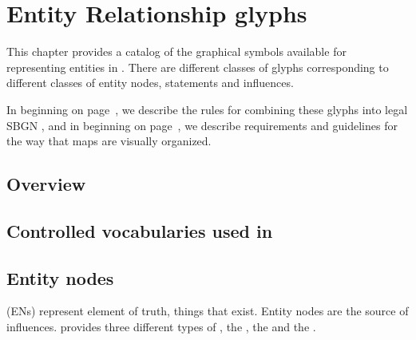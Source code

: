 
\chapter{Entity Relationship glyphs}
\label{chp:glyph}

This chapter provides a catalog of the graphical symbols available for representing entities in \ERms.  There are different classes of glyphs corresponding to different classes of entity nodes, statements and influences.

In  beginning on page~\pageref{chp:grammar}, we describe the rules for combining these glyphs into legal SBGN \ERs, and in  beginning on page~\pageref{chp:layout}, we describe requirements and guidelines for the way that maps are visually organized.

\section{Overview}
 

 
\section{Controlled vocabularies used in \SBGNERLone}\label{sec:CVs}


 
 
\section{Entity nodes}\label{sec:ENs}

 (ENs) represent element of truth, things that exist. 
Entity nodes are the source of influences. \SBGNERLone{} provides three different types of , the , the  and the . 

